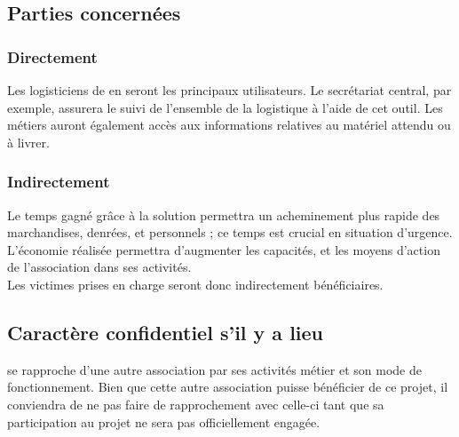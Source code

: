 \subsection{Parties concernées}

\subsubsection{Directement}
Les logisticiens de \mo en seront les principaux utilisateurs. Le secrétariat central, par exemple, assurera le suivi de l'ensemble de la logistique à l'aide de cet outil.
Les métiers auront également accès aux informations relatives au matériel attendu ou à livrer.

\subsubsection{Indirectement}
Le temps gagné grâce à la solution permettra un acheminement plus rapide des marchandises, denrées, et personnels ; ce temps est crucial en situation d'urgence. L'économie réalisée permettra d'augmenter les capacités, et les moyens d'action de l'association dans ses activités.
\\
Les victimes prises en charge seront donc indirectement bénéficiaires.


\subsection{Caractère confidentiel s'il y a lieu}
\mo se rapproche d'une autre association par ses activités métier et son mode de fonctionnement. Bien que cette autre association puisse bénéficier de ce projet, il conviendra de ne pas faire de rapprochement avec celle-ci tant que sa participation au projet ne sera pas officiellement engagée.

